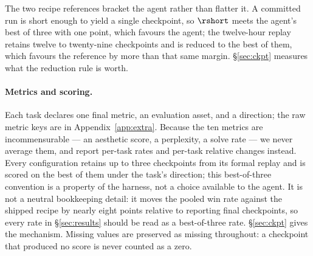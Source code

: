 The two recipe references bracket the agent rather than flatter it. A committed run is short enough to
yield a single checkpoint, so $\rshort$ meets the agent's best of three with one point, which favours
the agent; the twelve-hour replay retains twelve to twenty-nine checkpoints and is reduced to the best
of them, which favours the reference by more than that same margin. \S\ref{sec:ckpt} measures what the
reduction rule is worth.

\paragraph{Metrics and scoring.} Each task declares one final metric, an evaluation asset, and a
direction; the raw metric keys are in Appendix~\ref{app:extra}. Because the ten metrics are
incommensurable --- an aesthetic score, a perplexity, a solve rate --- we never average them, and
report per-task rates and per-task relative changes instead. Every configuration retains up to
three checkpoints from its formal replay and is scored on the best of them under the task's
direction; this best-of-three convention is a property of the harness, not a choice available to
the agent. It is not a neutral bookkeeping detail: it moves the pooled win rate against the shipped
recipe by nearly eight points relative to reporting final checkpoints, so every rate in
\S\ref{sec:results} should be read as a best-of-three rate. \S\ref{sec:ckpt} gives the mechanism. Missing values are
preserved as missing throughout: a checkpoint that produced no score is never counted as a zero.

